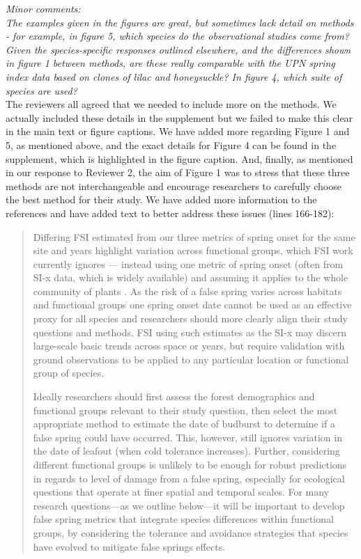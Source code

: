\documentclass[11pt,a4paper]{article}
\begin{document}
\textit{Minor comments: \\
The examples given in the figures are great, but sometimes lack detail on methods - for example, in figure 5, which species do the observational studies come from?  Given the species-specific responses outlined elsewhere, and the differences shown in figure 1 between methods, are these really comparable with the UPN spring index data based on clones of lilac and honeysuckle?
In figure 4, which suite of species are used?} \\

The reviewers all agreed that we needed to include more on the methods. We actually included these details in the supplement but we failed to make this clear in the main text or figure captions. We have added more regarding Figure 1 and 5, as mentioned above, and the exact details for Figure 4 can be found in the supplement, which is highlighted in the figure caption. And, finally, as mentioned in our response to Reviewer 2, the aim of Figure 1 was to stress that these three methods are not interchangeable and encourage researchers to carefully choose the best method for their study. We have added more information to the references and have added text to better address these issues (lines 166-182): 

\begin{quotation}
Differing FSI estimated from our three metrics of spring onset for the same site and years highlight variation across functional groups, which FSI work currently ignores --- instead using one metric of spring onset (often from SI-x data, which is widely available) and assuming it applies to the whole community of plants \citep{Allstadt2015, Marino2011, Mehdipoor2017, Peterson2014}. As the risk of a false spring varies across habitats and functional groups \citep{Martin2010} one spring onset date cannot be used as an effective proxy for all species and researchers should more clearly align their study questions and methods. FSI using such estimates as the SI-x may discern large-scale basic trends across space or years, but require validation with ground observations to be applied to any particular location or functional group of species. 

Ideally researchers should first assess the forest demographics and functional groups relevant to their study question, then select the most appropriate method to estimate the date of budburst to determine if a false spring could have occurred. This, however, still ignores variation in the date of leafout (when cold tolerance increases). Further, considering different functional groups is unlikely to be enough for robust predictions in regards to level of damage from a false spring, especially for ecological questions that operate at finer spatial and temporal scales. For many research questions---as we outline below---it will be important to develop false spring metrics that integrate species differences within functional groups, by considering the tolerance and avoidance strategies that species have evolved to mitigate false springs effects.
\end{quotation}




\newpage

\end{document}
